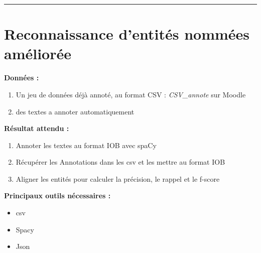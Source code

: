 \newcommand{\numTD}{TD1}
\newcommand{\themeTD}{Analyse en caractères}
\newcommand{\file}{toto.tex}



\hrule

\noindent{}
\newline

\section{Reconnaissance d'entités nommées améliorée}
\textbf{Données :}
\begin{enumerate}
  \item Un jeu de données déjà annoté, au format CSV : \textit{CSV\_annote} sur Moodle
 \item des textes a annoter automatiquement 
\end{enumerate}

\textbf{Résultat attendu :}

\begin{enumerate}
  \item Annoter les textes au format IOB avec spaCy
  \item Récupérer les Annotations dans les csv et les mettre au format IOB
  \item Aligner les entités pour calculer la précision, le rappel et le f-score
\end{enumerate}   
  


\textbf{Principaux outils nécessaires :}
\begin{itemize}
  \item csv 
  \item Spacy
  \item Json
  
\end{itemize}



